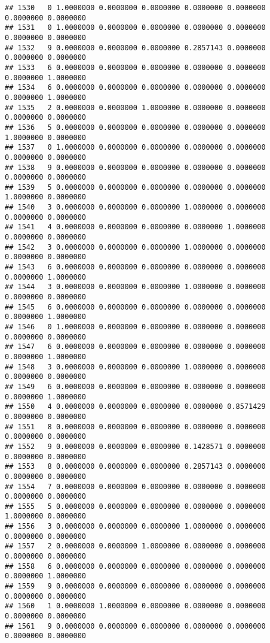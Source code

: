 \documentclass[
]{article}
\begin{document}
\begin{verbatim}
## 1530   0 1.0000000 0.0000000 0.0000000 0.0000000 0.0000000 0.0000000 0.0000000
## 1531   0 1.0000000 0.0000000 0.0000000 0.0000000 0.0000000 0.0000000 0.0000000
## 1532   9 0.0000000 0.0000000 0.0000000 0.2857143 0.0000000 0.0000000 0.0000000
## 1533   6 0.0000000 0.0000000 0.0000000 0.0000000 0.0000000 0.0000000 1.0000000
## 1534   6 0.0000000 0.0000000 0.0000000 0.0000000 0.0000000 0.0000000 1.0000000
## 1535   2 0.0000000 0.0000000 1.0000000 0.0000000 0.0000000 0.0000000 0.0000000
## 1536   5 0.0000000 0.0000000 0.0000000 0.0000000 0.0000000 1.0000000 0.0000000
## 1537   0 1.0000000 0.0000000 0.0000000 0.0000000 0.0000000 0.0000000 0.0000000
## 1538   9 0.0000000 0.0000000 0.0000000 0.0000000 0.0000000 0.0000000 0.0000000
## 1539   5 0.0000000 0.0000000 0.0000000 0.0000000 0.0000000 1.0000000 0.0000000
## 1540   3 0.0000000 0.0000000 0.0000000 1.0000000 0.0000000 0.0000000 0.0000000
## 1541   4 0.0000000 0.0000000 0.0000000 0.0000000 1.0000000 0.0000000 0.0000000
## 1542   3 0.0000000 0.0000000 0.0000000 1.0000000 0.0000000 0.0000000 0.0000000
## 1543   6 0.0000000 0.0000000 0.0000000 0.0000000 0.0000000 0.0000000 1.0000000
## 1544   3 0.0000000 0.0000000 0.0000000 1.0000000 0.0000000 0.0000000 0.0000000
## 1545   6 0.0000000 0.0000000 0.0000000 0.0000000 0.0000000 0.0000000 1.0000000
## 1546   0 1.0000000 0.0000000 0.0000000 0.0000000 0.0000000 0.0000000 0.0000000
## 1547   6 0.0000000 0.0000000 0.0000000 0.0000000 0.0000000 0.0000000 1.0000000
## 1548   3 0.0000000 0.0000000 0.0000000 1.0000000 0.0000000 0.0000000 0.0000000
## 1549   6 0.0000000 0.0000000 0.0000000 0.0000000 0.0000000 0.0000000 1.0000000
## 1550   4 0.0000000 0.0000000 0.0000000 0.0000000 0.8571429 0.0000000 0.0000000
## 1551   8 0.0000000 0.0000000 0.0000000 0.0000000 0.0000000 0.0000000 0.0000000
## 1552   9 0.0000000 0.0000000 0.0000000 0.1428571 0.0000000 0.0000000 0.0000000
## 1553   8 0.0000000 0.0000000 0.0000000 0.2857143 0.0000000 0.0000000 0.0000000
## 1554   7 0.0000000 0.0000000 0.0000000 0.0000000 0.0000000 0.0000000 0.0000000
## 1555   5 0.0000000 0.0000000 0.0000000 0.0000000 0.0000000 1.0000000 0.0000000
## 1556   3 0.0000000 0.0000000 0.0000000 1.0000000 0.0000000 0.0000000 0.0000000
## 1557   2 0.0000000 0.0000000 1.0000000 0.0000000 0.0000000 0.0000000 0.0000000
## 1558   6 0.0000000 0.0000000 0.0000000 0.0000000 0.0000000 0.0000000 1.0000000
## 1559   9 0.0000000 0.0000000 0.0000000 0.0000000 0.0000000 0.0000000 0.0000000
## 1560   1 0.0000000 1.0000000 0.0000000 0.0000000 0.0000000 0.0000000 0.0000000
## 1561   9 0.0000000 0.0000000 0.0000000 0.0000000 0.0000000 0.0000000 0.0000000

\end{verbatim}
\end{document}
